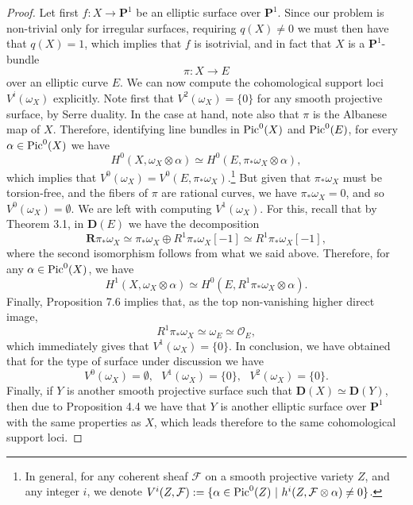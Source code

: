 \documentclass{amsart}
\theoremstyle{plain}
\theoremstyle{definition}
\numberwithin{equation}{section}
\begin{document}
\begin{proof}
Let first $f: X \rightarrow {{ \mathbf{P}}}^1$ be an elliptic surface over ${{ \mathbf{P}}}^1$. Since our problem is non-trivial only for irregular surfaces, requiring $q (X) \neq 0$ 
we must then have that $q (X) = 1$, which implies that $f$ is 
isotrivial, and in fact that $X$ is a ${{ \mathbf{P}}}^1$-bundle 
$$\pi: X \longrightarrow E$$
over an elliptic curve $E$. We can now compute the cohomological support loci $V^i (\omega_X)$ explicitly.
Note first that $V^2(\omega_X) = \{0\}$ for any smooth projective surface, by Serre duality. In the case at 
hand, note also that $\pi$ is the Albanese map of $X$. Therefore, identifying line bundles in 
${\rm Pic}^0 (X)$ and ${\rm Pic}^0 (E)$, for every $\alpha \in {\rm Pic}^0 (X)$ we have
$$H^0 (X, \omega_X \otimes \alpha) \simeq H^0 (E, \pi_* \omega_X \otimes \alpha),$$
which implies that $V^0 (\omega_X) = V^0 (E, \pi_* \omega_X)$.\footnote{In general, for any coherent sheaf ${\mathcal{F}}$ on a smooth projective variety $Z$, and any integer $i$, we denote
$V^i (Z, {\mathcal{F}}) : = \{ \alpha \in {\rm Pic}^0 (Z) ~|~ h^i (Z, {\mathcal{F}} \otimes \alpha) \neq 0 \}$.} But given that $\pi_* \omega_X$ must be torsion-free, and the fibers of $\pi$ are rational curves, we have $\pi_* \omega_X = 0$, and so 
$V^0 (\omega_X) = \emptyset$. We are left with computing $V^1 (\omega_X)$. For this, recall that 
by \cite{kollar2} Theorem 3.1, in ${\mathbf{D}} (E)$ we have the decomposition
$${\mathbf{R}} \pi_* \omega_X \simeq \pi_* \omega_X \oplus R^1\pi_* \omega_X [-1] \simeq 
R^1\pi_* \omega_X [-1],$$
where the second isomorphism follows from what we said above.
Therefore, for any $\alpha \in {\rm Pic}^0 (X)$, we have 
$$H^1 ( X, \omega_X \otimes \alpha) \simeq H^0 (E, R^1 \pi_* \omega_X \otimes \alpha).$$
Finally, \cite{kollar1} Proposition 7.6 implies that, as the top non-vanishing higher direct image, 
$$R^1 \pi_* \omega_X \simeq \omega_E \simeq {{\mathcal O}}_E,$$
which immediately gives that $V^1 (\omega_X) = \{0\}$. In conclusion, we have obtained that for the 
type of surface under discussion we have 
$$V^0 (\omega_X) = \emptyset, \,\,\,\, V^1 (\omega_X) = \{0\}, \,\,\,\, V^2 (\omega_X) = \{0\}.$$
Finally, if $Y$ is another smooth projective surface such that ${\mathbf{D}}(X) \simeq {\mathbf{D}}(Y)$, then due to \cite{bm} 
Proposition 4.4 we have that $Y$ is another elliptic surface over ${{ \mathbf{P}}}^1$ with the same properties as $X$, which leads therefore to the same cohomological support loci.


\end{proof}
\end{document}
